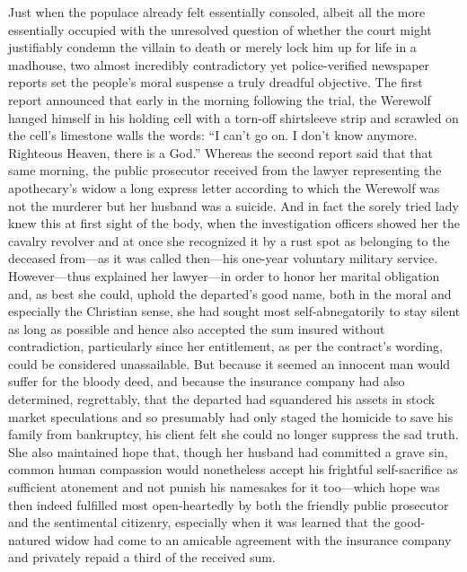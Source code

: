 \documentclass[12pt,a4paper]{article}
\begin{document}
Just when the populace already felt essentially consoled, albeit all the more essentially occupied with the unresolved question of whether the court might justifiably condemn the villain to death or merely lock him up for life in a madhouse, two almost incredibly contradictory yet police-verified newspaper reports set the people’s moral suspense a truly dreadful objective. The first report announced that early in the morning following the trial, the Werewolf hanged himself in his holding cell with a torn-off shirtsleeve strip and scrawled on the cell’s limestone walls the words: “I can’t go on. I don’t know anymore. Righteous Heaven, there is a God.” Whereas the second report said that that same morning, the public prosecutor received from the lawyer representing the apothecary’s widow a long express letter according to which the Werewolf was not the murderer but her husband was a suicide. And in fact the sorely tried lady knew this at first sight of the body, when the investigation officers showed her the cavalry revolver and at once she recognized it by a rust spot as belonging to the deceased from—as it was called then—his one-year voluntary military service. However—thus explained her lawyer—in order to honor her marital obligation and, as best she could, uphold the departed’s good name, both in the moral and especially the Christian sense, she had sought most self-abnegatorily to stay silent as long as possible and hence also accepted the sum insured without contradiction, particularly since her entitlement, as per the contract’s wording, could be considered unassailable. But because it seemed an innocent man would suffer for the bloody deed, and because the insurance company had also determined, regrettably, that the departed had squandered his assets in stock market speculations and so presumably had only staged the homicide to save his family from bankruptcy, his client felt she could no longer suppress the sad truth. She also maintained hope that, though her husband had committed a grave sin, common human compassion would nonetheless accept his frightful self-sacrifice as sufficient atonement and not punish his namesakes for it too—which hope was then indeed fulfilled most open-heartedly by both the friendly public prosecutor and the sentimental citizenry, especially when it was learned that the good-natured widow had come to an amicable agreement with the insurance company and privately repaid a third of the received sum.
\end{document}
